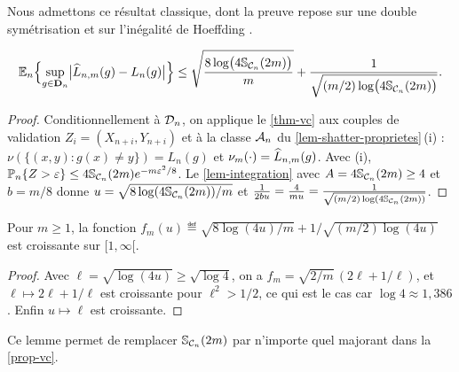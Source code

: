 Nous admettons ce résultat classique, dont la preuve repose sur une double symétrisation et sur l'inégalité de Hoeffding \citep{vapnik1971uniform,devroye1996probabilistic}.

\begin{proposition}\label{prop-vc}
\[
  \mathbb{E}_n\Bigl\{\sup_{g\in\mathbf{D}_n}\bigl|\widehat{L}_{n,m}(g)-L_n(g)\bigr|\Bigr\}\le\sqrt{\frac{8\log\bigl(4\mathbb{S}_{\mathcal{C}_n}(2m)\bigr)}{m}}+\frac{1}{\sqrt{(m/2)\log\bigl(4\mathbb{S}_{\mathcal{C}_n}(2m)\bigr)}}.
\]
\end{proposition}

\begin{proof}
Conditionnellement à $\mathcal{D}_n$, on applique le \cref{thm-vc} aux couples de validation $Z_i=(X_{n+i},Y_{n+i})$ et à la classe $\mathcal{A}_n$ du \cref{lem-shatter-proprietes}\,(i) : $\nu(\{(x,y):g(x)\neq y\})=L_n(g)$ et $\nu_m(\cdot)=\widehat{L}_{n,m}(g)$. Avec (i), $\mathbb{P}_n\{Z>\varepsilon\}\le4\mathbb{S}_{\mathcal{C}_n}(2m)e^{-m\varepsilon^2/8}$. Le \cref{lem-integration} avec $A=4\mathbb{S}_{\mathcal{C}_n}(2m)\ge4$ et $b=m/8$ donne $u=\sqrt{8\log(4\mathbb{S}_{\mathcal{C}_n}(2m))/m}$ et
$\frac{1}{2bu}=\frac{4}{mu}=\frac{1}{\sqrt{(m/2)\log(4\mathbb{S}_{\mathcal{C}_n}(2m))}}$.
\end{proof}

\begin{lemme}\label{lem-monotonie}
Pour $m\ge1$, la fonction $f_m(u)\eqdef\sqrt{8\log(4u)/m}+1/\sqrt{(m/2)\log(4u)}$ est croissante sur $[1,\infty[$.
\end{lemme}

\begin{proof}
Avec $\ell=\sqrt{\log(4u)}\ge\sqrt{\log4}$, on a $f_m=\sqrt{2/m}\,(2\ell+1/\ell)$, et $\ell\mapsto2\ell+1/\ell$ est croissante pour $\ell^2>1/2$, ce qui est le cas car $\log4\approx1{,}386$. Enfin $u\mapsto\ell$ est croissante.
\end{proof}

Ce lemme permet de remplacer $\mathbb{S}_{\mathcal{C}_n}(2m)$ par n'importe quel majorant dans la \cref{prop-vc}.
